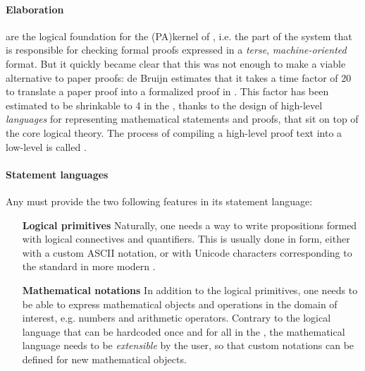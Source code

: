 \paragraph{Elaboration}

\AP
{} are the logical foundation for the \intro(PA){kernel} of
, i.e. the part of the system that is responsible for
checking formal proofs expressed in a \emph{terse}, \emph{machine-oriented}
format. But it quickly became clear that this was not enough to make  a viable alternative to paper proofs: de Bruijn estimates that it
takes a time factor of 20 to translate a paper proof into a formalized proof in
 . This factor has been
estimated to be shrinkable to 4 in the  
, thanks to the design of high-level \emph{languages}
for representing mathematical statements and proofs, that sit on top of the core
logical theory. The process of compiling a high-level proof text into a low-level
 is called .

\paragraph{Statement languages}

Any  must provide the two following features in its statement
language:

\begin{itemize}
  \item[\textbf{Logical primitives}] Naturally, one needs a way to write
  propositions formed with logical connectives and quantifiers. This is usually
  done in  form, either with a custom ASCII notation, or with
  Unicode characters corresponding to the standard  in more modern
  . 
  \item[\textbf{Mathematical notations}] In addition to the logical primitives,
  one needs to be able to express mathematical objects and operations in the
  domain of interest, e.g. numbers and arithmetic operators. Contrary to the
  logical language that can be hardcoded once and for all in the , the mathematical language needs to be \emph{extensible} by the
  user, so that custom notations can be defined for new mathematical objects.
\end{itemize}


